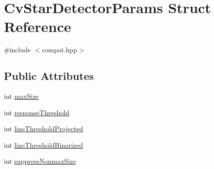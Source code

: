 \hypertarget{structCvStarDetectorParams}{\section{Cv\-Star\-Detector\-Params Struct Reference}
\label{structCvStarDetectorParams}
}


{\ttfamily \#include $<$compat.\-hpp$>$}

\subsection*{Public Attributes}
\begin{DoxyCompactItemize}
\item 
int \hyperlink{structCvStarDetectorParams_ae4a5645ee251bf0b6bcfef97972b00ed}{max\-Size}
\item 
int \hyperlink{structCvStarDetectorParams_a612e4bed30e8dbbda35f61c2b869360b}{response\-Threshold}
\item 
int \hyperlink{structCvStarDetectorParams_ac6c399320ca6052b0767dafc2273f3c6}{line\-Threshold\-Projected}
\item 
int \hyperlink{structCvStarDetectorParams_af8dddfad7b61bb6ce1bc3f3cc9b663a6}{line\-Threshold\-Binarized}
\item 
int \hyperlink{structCvStarDetectorParams_a213ff31a306fcf3fbace6939d8154cd4}{suppress\-Nonmax\-Size}
\end{DoxyCompactItemize}


